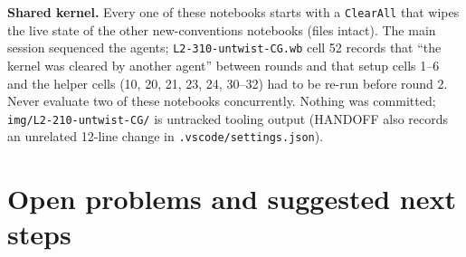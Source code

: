\documentclass[10pt]{article}
\newcommand{\nb}[1]{\texttt{#1}}
\begin{document}
\textbf{Shared kernel.} Every one of these notebooks starts with a \nb{ClearAll} that wipes the live state of the other new-conventions notebooks (files intact). The main session sequenced the agents; \nb{L2-\allowbreak{}310-\allowbreak{}untwist-\allowbreak{}CG.\allowbreak{}wb} cell 52 records that ``the kernel was cleared by another agent'' between rounds and that setup cells 1--6 and the helper cells (10, 20, 21, 23, 24, 30--32) had to be re-run before round 2. Never evaluate two of these notebooks concurrently. Nothing was committed; \nb{img/\allowbreak{}L2-\allowbreak{}210-\allowbreak{}untwist-\allowbreak{}CG/\allowbreak{}} is untracked tooling output (HANDOFF also records an unrelated 12-line change in \nb{.\allowbreak{}vscode/\allowbreak{}settings.\allowbreak{}json}).

\section{Open problems and suggested next steps}\label{sec:open}
\end{document}
